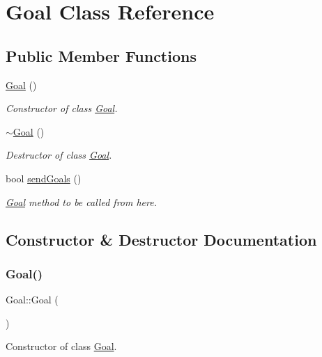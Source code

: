 \hypertarget{class_goal}{}\section{Goal Class Reference}
\label{class_goal}
\subsection*{Public Member Functions}
\begin{DoxyCompactItemize}
\item 
\hyperlink{class_goal_aef5013c9bf548e51178f58da869d508a}{Goal} ()
\begin{DoxyCompactList}\small\item\em Constructor of class \hyperlink{class_goal}{Goal}. \end{DoxyCompactList}\item 
\hyperlink{class_goal_a0719b571c7c6995948a2c55137459535}{$\sim$\+Goal} ()
\begin{DoxyCompactList}\small\item\em Destructor of class \hyperlink{class_goal}{Goal}. \end{DoxyCompactList}\item 
bool \hyperlink{class_goal_af70832313448e78fc425e039969e8a6e}{send\+Goals} ()
\begin{DoxyCompactList}\small\item\em \hyperlink{class_goal}{Goal} method to be called from here. \end{DoxyCompactList}\end{DoxyCompactItemize}


\subsection{Constructor \& Destructor Documentation}
\mbox{\label{class_goal_aef5013c9bf548e51178f58da869d508a}} 
\subsubsection{\texorpdfstring{Goal()}{Goal()}}
{\footnotesize\ttfamily Goal\+::\+Goal (\begin{DoxyParamCaption}{ }\end{DoxyParamCaption})}



Constructor of class \hyperlink{class_goal}{Goal}. 


